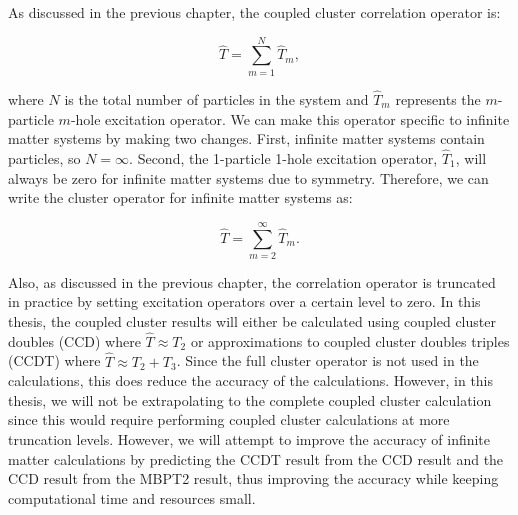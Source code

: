 As discussed in the previous chapter, the coupled cluster correlation operator is:

\begin{equation} \label{T_repeat}
	\hat{T} = \sum_{m=1}^N \hat{T}_m,
\end{equation}

where $N$ is the total number of particles in the system and $\hat{T}_m$ represents the $m$-particle $m$-hole excitation operator. We can make this operator specific to infinite matter systems by making two changes. First, infinite matter systems contain particles, so $N = \infty$. Second, the 1-particle 1-hole excitation operator, $\hat{T}_1$, will always be zero for infinite matter systems due to symmetry. Therefore, we can write the cluster operator for infinite matter systems as:

\begin{equation} \label{T_repeat2}
	\hat{T} = \sum_{m=2}^\infty \hat{T}_m.
\end{equation}

Also, as discussed in the previous chapter, the correlation operator is truncated in practice by setting excitation operators over a certain level to zero. In this thesis, the coupled cluster results will either be calculated using coupled cluster doubles (CCD) where $\hat{T} \approx T_2$ or approximations to coupled cluster doubles triples (CCDT) where $\hat{T} \approx T_2 + T_3$. Since the full cluster operator is not used in the calculations, this does reduce the accuracy of the calculations. However, in this thesis, we will not be extrapolating to the complete coupled cluster calculation since this would require performing coupled cluster calculations at more truncation levels. However, we will attempt to improve the accuracy of infinite matter calculations by predicting the CCDT result from the CCD result and the CCD result from the MBPT2 result, thus improving the accuracy while keeping computational time and resources small.


